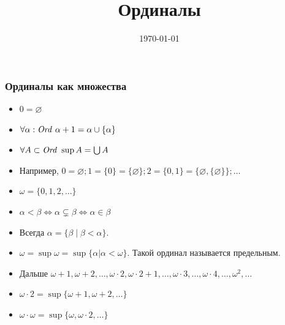 \documentclass[10pt]{beamer}
\title{Ординалы}
\date{\today}
\begin{document}
\begin{frame}[plain]
    \maketitle
\end{frame}

\begin{frame}
    \frametitle{Ординалы как множества}
    \begin{itemize}
        \item $0 = \varnothing$
        \item $\forall \alpha : \mathit{Ord}~\alpha + 1 = \alpha \cup \{\alpha\}$
        \item $\forall A \subset \mathit{Ord}~\sup A = \bigcup A$
        \pause
        \item Например, $0 = \varnothing; 1 = \{0\} = \{\varnothing\}; 2 = \{0,1\} = \{\varnothing, \{\varnothing\}\}; \ldots$
        \item $\omega = \{0,1,2,\ldots\}$
        \pause
        \item $\alpha < \beta \Leftrightarrow \alpha \subsetneq \beta \Leftrightarrow \alpha \in \beta$
        \item Всегда $\alpha = \{\beta \mid \beta < \alpha\}$.
        \pause
        \item $\omega = \sup \omega = \sup \{\alpha | \alpha < \omega\}$. Такой ординал называется предельным.
        \item Дальше $\omega + 1, \omega + 2, \ldots, \omega \cdot 2, \omega \cdot 2 + 1, \ldots, \omega \cdot 3, \ldots, \omega \cdot 4, \ldots, \omega^2, \ldots$
        \item $\omega \cdot 2 = \sup \{\omega + 1, \omega +2, \ldots\}$
        \item $\omega \cdot \omega = \sup \{\omega, \omega \cdot 2, \ldots\}$
    \end{itemize}
\end{frame}
\end{document}
